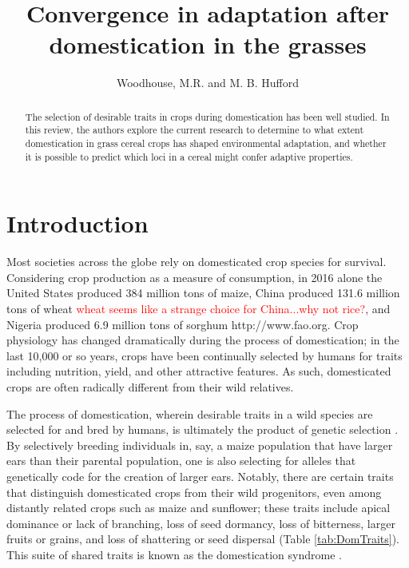 \documentclass[12pt]{article}
\title{Convergence in adaptation after domestication in the grasses}
\author{Woodhouse, M.R. and M. B. Hufford}
\newcommand{\mbh}[1]{\textcolor{red}{\normalsize  #1}}
\begin{document}
\maketitle

\begin{abstract}
The selection of desirable traits in crops during domestication has been well studied. In this review, the authors explore the current research to determine to what extent domestication in grass cereal crops has shaped environmental adaptation, and whether it is possible to predict which loci in a cereal might confer adaptive properties.
\end{abstract}

\section*{Introduction}
Most societies across the globe rely on domesticated crop species for survival.
Considering crop production as a measure of consumption, in 2016 alone the United States produced 384 million tons of maize, China produced 131.6 million tons of wheat \mbh{wheat seems like a strange choice for China...why not rice?}, and Nigeria produced 6.9 million tons of sorghum http://www.fao.org.
Crop physiology has changed dramatically during the process of domestication; in the last 10,000 or so years, crops have been continually selected by humans for traits including nutrition, yield, and other attractive features.
As such, domesticated crops are often radically different from their wild relatives.

The process of domestication, wherein desirable traits in a wild species are selected for and bred by humans, is ultimately the product of genetic selection \citep{Doebley2006}.
By selectively breeding individuals in, say, a maize population that have larger ears than their parental population, one is also selecting for alleles that genetically code for the creation of larger ears. 
Notably, there are certain traits that distinguish domesticated crops from their wild progenitors, even among distantly related crops such as maize and sunflower; these traits include apical dominance or lack of branching, loss of seed dormancy, loss of bitterness, larger fruits or grains, and loss of shattering or seed dispersal (Table \ref{tab:DomTraits}).
This suite of shared traits is known as the domestication syndrome \citep{Hammer1984}.
\end{document}
